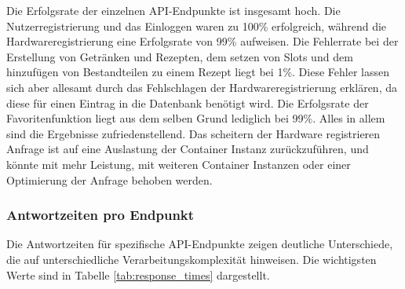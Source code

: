 Die Erfolgsrate der einzelnen API-Endpunkte ist insgesamt hoch. Die Nutzerregistrierung und das 
Einloggen waren zu 100\% erfolgreich, während die Hardwareregistrierung eine Erfolgsrate von 99\% 
aufweisen. Die Fehlerrate bei der Erstellung von Getränken und Rezepten, dem setzen von Slots und 
dem hinzufügen von Bestandteilen zu einem Rezept liegt bei 1\%. Diese Fehler lassen sich aber 
allesamt durch das Fehlschlagen der Hardwareregistrierung erklären, da diese für einen Eintrag in 
die Datenbank benötigt wird. Die Erfolgsrate der Favoritenfunktion liegt aus dem selben Grund 
lediglich bei 99\%. Alles in allem sind die Ergebnisse zufriedenstellend. 
Das scheitern der Hardware registrieren Anfrage ist auf eine Auslastung der Container Instanz 
zurückzuführen, und könnte mit mehr Leistung, mit weiteren Container Instanzen oder einer 
Optimierung der Anfrage behoben werden.

\subsubsection*{Antwortzeiten pro Endpunkt}

Die Antwortzeiten für spezifische API-Endpunkte zeigen deutliche Unterschiede, die auf 
unterschiedliche Verarbeitungskomplexität hinweisen. Die wichtigsten Werte sind in Tabelle 
\ref{tab:response_times} dargestellt.

